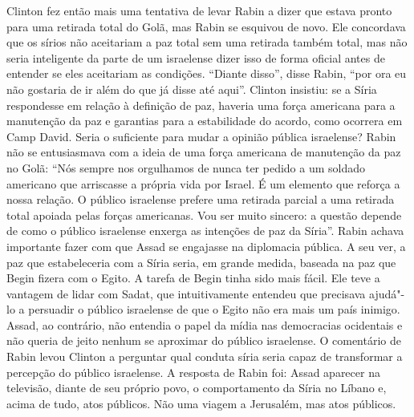 Clinton fez então mais uma tentativa de levar Rabin a dizer que estava
pronto para uma retirada total do Golã, mas Rabin se esquivou de novo.
Ele concordava que os sírios não aceitariam a paz total sem uma retirada
também total, mas não seria inteligente da parte de um israelense dizer isso de
forma oficial antes de entender se eles aceitariam as condições.
``Diante disso'', disse Rabin, ``por ora eu não gostaria de ir além do
que já disse até aqui''. Clinton insistiu: se a Síria respondesse em
relação à definição de paz, haveria uma força americana para a
manutenção da paz e garantias para a estabilidade do acordo, como ocorrera
em Camp David. Seria o suficiente para mudar a opinião
pública israelense? Rabin não se entusiasmava com a ideia de uma força
americana de manutenção da paz no Golã: ``Nós sempre nos orgulhamos de
nunca ter pedido a um soldado americano que arriscasse a própria vida
por Israel. É um elemento que reforça a nossa relação. O público
israelense prefere uma retirada parcial a uma retirada total apoiada
pelas forças americanas. Vou ser muito sincero: a questão depende de
como o público israelense enxerga as intenções de paz da Síria''. Rabin
achava importante fazer com que Assad se engajasse na diplomacia pública.
A seu ver, a paz que estabeleceria com a Síria seria, em grande medida, baseada
na paz que Begin fizera com o Egito. A tarefa de Begin tinha sido mais
fácil. Ele teve a vantagem de lidar com Sadat, que intuitivamente
entendeu que precisava ajudá"-lo a persuadir o público israelense de que
o Egito não era mais um país inimigo. Assad, ao contrário, não entendia o
papel da mídia nas democracias ocidentais e não queria de jeito nenhum
se aproximar do público israelense. O comentário de Rabin levou Clinton
a perguntar qual conduta síria seria capaz de transformar a percepção do
público israelense. A resposta de Rabin foi: Assad aparecer na televisão,
diante de seu próprio povo, o comportamento da Síria no Líbano e, acima
de tudo, atos públicos. Não uma viagem a Jerusalém, mas atos públicos.


